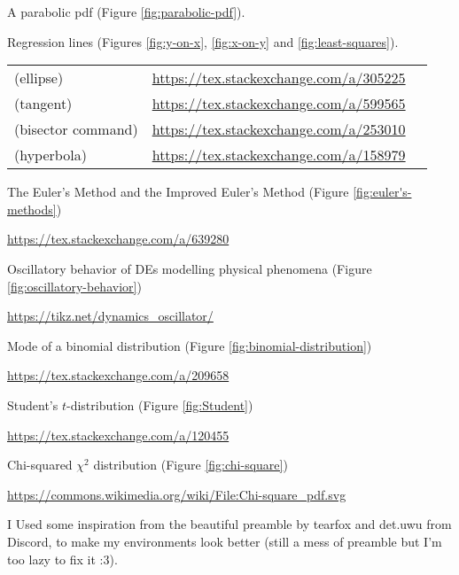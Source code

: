 \documentclass[oneside]{book}
\begin{document}
\begin{enumerate}[label={[\arabic*]}]
  A parabolic pdf (Figure \ref{fig:parabolic-pdf}). 
  
  Regression lines (Figures \ref{fig:y-on-x}, \ref{fig:x-on-y} and \ref{fig:least-squares}).

  \begin{tabular}{lSc}
    (ellipse) & \url{https://tex.stackexchange.com/a/305225}\\
    (tangent) & \url{https://tex.stackexchange.com/a/599565}\\
    (bisector command) & \url{https://tex.stackexchange.com/a/253010}\\
    (hyperbola) & \url{https://tex.stackexchange.com/a/158979}
  \end{tabular}
  \item\label{source:euler's-methods} The Euler's Method and the Improved Euler's Method (Figure \ref{fig:euler's-methods})
  
  \url{https://tex.stackexchange.com/a/639280}
  \item\label{source:oscillatory-behavior} Oscillatory behavior of DEs modelling physical phenomena (Figure \ref{fig:oscillatory-behavior})
  
  \url{https://tikz.net/dynamics_oscillator/}
  \item\label{source:binomial-distribution} Mode of a binomial distribution (Figure \ref{fig:binomial-distribution})

  \url{https://tex.stackexchange.com/a/209658}
  \item\label{source:Student} Student's \(t\)-distribution (Figure \ref{fig:Student})

  \url{https://tex.stackexchange.com/a/120455}
  \item\label{source:chi-squared} Chi-squared \(\chi^2\) distribution (Figure \ref{fig:chi-square})

  \url{https://commons.wikimedia.org/wiki/File:Chi-square_pdf.svg}
  \item I Used some inspiration from the beautiful preamble by tearfox and det.uwu from Discord, to make my environments look better (still a mess of preamble but I'm too lazy to fix it :3).
\end{enumerate}
\end{document}
